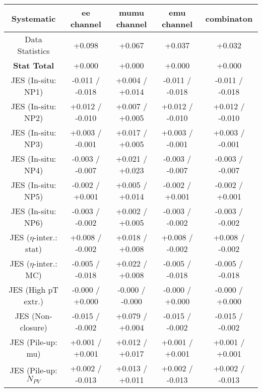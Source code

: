 \begin{table}[htbp]
\scriptsize
  \begin{center} 
  \begin{tabular}{|c|c|c|c|c|}
  \hline
Systematic                            &  ee channel&  mumu channel&  emu channel&  combinaton\\
  \hline
Data Statistics                       &+0.098              & +0.067              & +0.037              & +0.032             \\
\hline
\textbf{Stat Total}                   &+0.000              & +0.000              & +0.000              & +0.000             \\
\hline
JES (In-situ: NP1)                    &-0.011   / -0.018   & +0.004   / +0.014   & -0.011   / -0.018   & -0.011   / -0.018  \\
JES (In-situ: NP2)                    &+0.012   / -0.010   & +0.007   / +0.005   & +0.012   / -0.010   & +0.012   / -0.010  \\
JES (In-situ: NP3)                    &+0.003   / -0.001   & +0.017   / +0.005   & +0.003   / -0.001   & +0.003   / -0.001  \\
JES (In-situ: NP4)                    &-0.003   / -0.007   & +0.021   / +0.023   & -0.003   / -0.007   & -0.003   / -0.007  \\
JES (In-situ: NP5)                    &-0.002   / +0.001   & +0.005   / +0.014   & -0.002   / +0.001   & -0.002   / +0.001  \\
JES (In-situ: NP6)                    &-0.003   / -0.002   & +0.002   / +0.005   & -0.003   / -0.002   & -0.003   / -0.002  \\
JES ($\eta$-inter.: stat)             &+0.008   / -0.002   & +0.018   / +0.008   & +0.008   / -0.002   & +0.008   / -0.002  \\
JES ($\eta$-inter.: MC)               &-0.005   / -0.018   & +0.022   / +0.008   & -0.005   / -0.018   & -0.005   / -0.018  \\
JES (High pT extr.)                   &-0.000   / +0.000   & -0.000   / -0.000   & -0.000   / +0.000   & -0.000   / +0.000  \\
JES (Non-closure)                     &-0.015   / -0.002   & +0.079   / +0.004   & -0.015   / -0.002   & -0.015   / -0.002  \\
JES (Pile-up: mu)                     &+0.001   / +0.001   & +0.012   / +0.017   & +0.001   / +0.001   & +0.001   / +0.001  \\
JES (Pile-up: $N_{PV}$                &+0.002   / -0.013   & +0.013   / +0.011   & +0.002   / -0.013   & +0.002   / -0.013  \\

\end{tabular}
\end{center}
\end{table}
